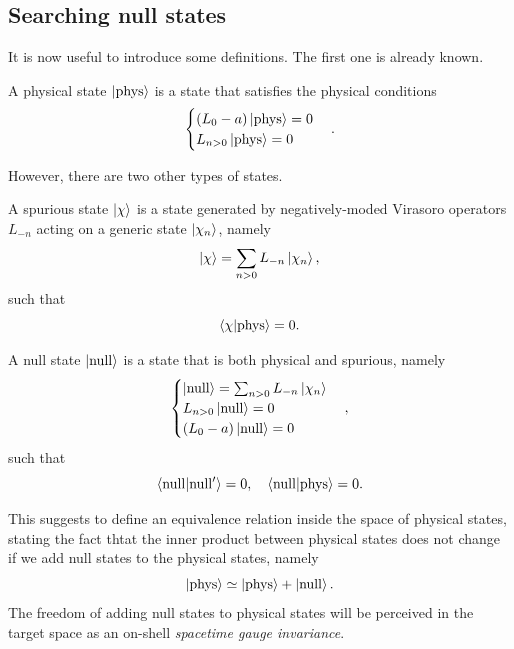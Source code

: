 \subsection{Searching null states}
It is now useful to introduce some definitions. The first one is already known.
\begin{defn}
    A physical state $\ket{\mathrm{phys}}$ is a state that satisfies the physical conditions 
    \begin{equation}
        \begin{cases}
            (L_0 - a)\ket{\mathrm{phys}} = 0 \\
            L_{n > 0}\ket{\mathrm{phys}} = 0
        \end{cases}.
    \end{equation}
\end{defn}
However, there are two other types of states.
\begin{defn}
    A spurious state $\ket{\chi}$ is a state generated by negatively-moded Virasoro operators $L_{-n}$ acting on a generic state $\ket{\chi_n}$, namely 
    \begin{equation}
        \ket{\chi} = \sum_{n > 0}L_{-n}\ket{\chi_n},
    \end{equation}
    such that 
    \begin{equation}
        \langle \chi | \mathrm{phys} \rangle = 0.
    \end{equation}
\end{defn}
\begin{defn}
    A null state $\ket{\mathrm{null}}$ is a state that is both physical and spurious, namely 
    \begin{equation}
        \begin{cases}
            \ket{\mathrm{null}} = \sum_{n > 0}L_{-n}\ket{\chi_n} \\
            L_{n > 0}\ket{\mathrm{null}} = 0 \\
            (L_0 - a)\ket{\mathrm{null}} = 0
        \end{cases},
    \end{equation}
    such that 
    \begin{equation}
        \langle \mathrm{null} | \mathrm{null'} \rangle = 0,\quad \langle \mathrm{null} | \mathrm{phys} \rangle = 0.
    \end{equation}
\end{defn}
This suggests to define an equivalence relation inside the space of physical states, stating the fact thtat the inner product between physical states does not change if we add null states to the physical states, namely
\begin{equation}
\label{eq: equivalence relation physical/null states}
    \ket{\mathrm{phys}} \simeq \ket{\mathrm{phys}} + \ket{\mathrm{null}}.
\end{equation}
The freedom of adding null states to physical states will be perceived in the target space as an on-shell \emph{spacetime gauge invariance}. 

